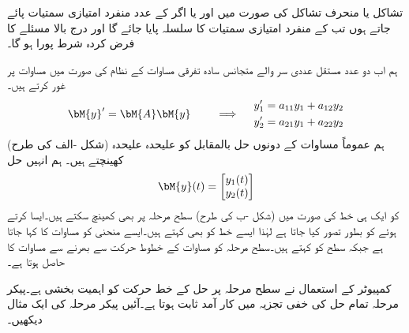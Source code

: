  تشاکل یا منحرف تشاکل   کی صورت میں اور یا اگر  کے  عدد منفرد امتیازی سمتیات پائے جاتے ہوں تب  کے منفرد امتیازی سمتیات کا سلسلہ پایا جائے گا اور درج بالا مسئلے کا فرض کردہ شرط پورا ہو گا۔


ہم اب  دو عدد مستقل عددی سر والے متجانس سادہ تفرقی  مساوات کے نظام کی صورت میں مساوات  پر غور کرتے ہیں۔
\begin{gather}\label{مساوات_نظام_سطح_مرحلہ_الف}
\begin{aligned}
\bM{y}'=\bM{A}\bM{y}\quad 
\end{aligned}\quad \implies \quad 
\begin{aligned}
y_1'&=a_{11}y_1+a_{12}y_2\\
y_2'&=a_{21}y_1+a_{22}y_2
\end{aligned}
\end{gather}
ہم عموماً مساوات  کے دونوں حل بالمقابل  کو علیحدہ علیحدہ (شکل -الف کی طرح) کھینچتے ہیں۔ ہم انہیں حل
\begin{align}
\bM{y}(t)=\begin{bmatrix} y_1(t) \\ y_2(t) \end{bmatrix}
\end{align}
کو ایک ہی خط کی صورت میں (شکل -ب کی طرح) سطح مرحلہ پر بھی کھینچ سکتے ہیں۔ایسا کرتے ہوئے  کو بطور  تصور کیا جاتا ہے لہٰذا ایسے خط کو  بھی کہتے ہیں۔ایسے منحنی کو مساوات  کا  کہا جاتا ہے جبکہ  سطح کو  کہتے ہیں۔سطح مرحلہ کو مساوات  کے خطوط حرکت سے بھرنے سے  مساوات  کا  حاصل ہوتا ہے۔ 

کمپیوٹر کے استعمال نے سطح مرحلہ پر حل کے خط حرکت کو اہمیت بخشی ہے۔پیکر مرحلہ تمام حل کی خفی تجزیہ میں کار آمد ثابت ہوتا ہے۔آئیں پیکر مرحلہ کی ایک مثال دیکھیں۔

